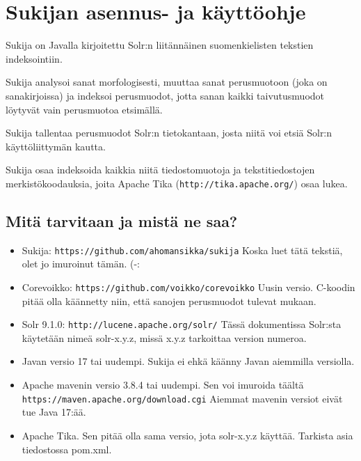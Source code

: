\documentclass[12pt]{article}
\begin{document}
\pagestyle{fancy}
\setlength{\parindent}{0pt}
\setlength{\parskip}{1ex plus 0.5ex minus 0.2ex}
\section*{Sukijan asennus- ja käyttöohje}


Sukija on Javalla kirjoitettu Solr:n liitännäinen suomenkielisten
tekstien indeksointiin.

Sukija analysoi sanat morfologisesti, muuttaa sanat perusmuotoon (joka
on sanakirjoissa) ja indeksoi perusmuodot, jotta sanan kaikki
taivutusmuodot löytyvät vain perusmuotoa etsimällä.

Sukija tallentaa perusmuodot Solr:n tietokantaan, josta niitä voi
etsiä Solr:n käyttöliittymän kautta.

Sukija osaa indeksoida kaikkia niitä tiedostomuotoja ja
tekstitiedostojen merkistökoodauksia, joita Apache Tika
(\verb=http://tika.apache.org/=) osaa lukea.


\subsection*{Mitä tarvitaan ja mistä ne saa?}

\begin{itemize}
\item Sukija:
      \verb=https://github.com/ahomansikka/sukija=
      Koska luet tätä tekstiä, olet jo imuroinut tämän. (-:

\item Corevoikko:
      \verb=https://github.com/voikko/corevoikko=
      Uusin versio. C-koodin pitää olla käännetty niin,
      että sanojen perusmuodot tulevat mukaan.

\item Solr 9.1.0:
      \verb=http://lucene.apache.org/solr/=
      Tässä dokumentissa Solr:sta käytetään nimeä solr-x.y.z,
      missä x.y.z tarkoittaa version numeroa.

\item Javan versio 17 tai uudempi. Sukija ei ehkä käänny Javan aiemmilla versiolla.

\item Apache mavenin versio 3.8.4 tai uudempi. Sen voi imuroida täältä
      \verb=https://maven.apache.org/download.cgi=
      Aiemmat mavenin versiot eivät tue Java 17:ää.

\item Apache Tika. Sen pitää olla sama versio, jota solr-x.y.z
      käyttää. Tarkista asia tiedostossa pom.xml.
\end{itemize}
\end{document}
